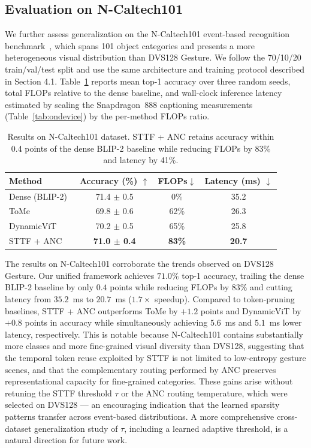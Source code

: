 \documentclass{article}
\begin{document}
\subsection{Evaluation on N-Caltech101}

We further assess generalization on the N-Caltech101 event-based recognition benchmark~\cite{orchard2015ncaltech}, which spans 101 object categories and presents a more heterogeneous visual distribution than DVS128 Gesture. We follow the 70/10/20 train/val/test split and use the same architecture and training protocol described in Section 4.1. Table~\ref{tab:ncaltech} reports mean top-1 accuracy over three random seeds, total FLOPs relative to the dense baseline, and wall-clock inference latency estimated by scaling the Snapdragon~888 captioning measurements (Table~\ref{tab:ondevice}) by the per-method FLOPs ratio.

\begin{table}[htbp]
\centering
\caption{Results on N-Caltech101 dataset. STTF + ANC retains accuracy within 0.4 points of the dense BLIP-2 baseline while reducing FLOPs by 83\% and latency by 41\%.}
\label{tab:ncaltech}
\begin{tabular}{lccc}
\toprule
Method & Accuracy (\%) $\uparrow$ & FLOPs$\downarrow$ & Latency (ms) $\downarrow$ \\
\midrule
Dense (BLIP-2)~\cite{li2023blip2} & 71.4 $\pm$ 0.5 & 0\% & 35.2 \\
ToMe~\cite{bolya2023tome}           & 69.8 $\pm$ 0.6 & 62\% & 26.3 \\
DynamicViT~\cite{rao2021dynamicvit}     & 70.2 $\pm$ 0.5 & 65\% & 25.8 \\
\midrule
STTF + ANC     & \textbf{71.0 $\pm$ 0.4} & \textbf{83\%} & \textbf{20.7} \\
\bottomrule
\end{tabular}
\end{table}

The results on N-Caltech101 corroborate the trends observed on DVS128 Gesture. Our unified framework achieves $71.0\%$ top-1 accuracy, trailing the dense BLIP-2 baseline by only $0.4$ points while reducing FLOPs by $83\%$ and cutting latency from $35.2$~ms to $20.7$~ms ($1.7\times$ speedup). Compared to token-pruning baselines, STTF + ANC outperforms ToMe by $+1.2$ points and DynamicViT by $+0.8$ points in accuracy while simultaneously achieving $5.6$~ms and $5.1$~ms lower latency, respectively. This is notable because N-Caltech101 contains substantially more classes and more fine-grained visual diversity than DVS128, suggesting that the temporal token reuse exploited by STTF is not limited to low-entropy gesture scenes, and that the complementary routing performed by ANC preserves representational capacity for fine-grained categories. These gains arise without retuning the STTF threshold $\tau$ or the ANC routing temperature, which were selected on DVS128 --- an encouraging indication that the learned sparsity patterns transfer across event-based distributions. A more comprehensive cross-dataset generalization study of $\tau$, including a learned adaptive threshold, is a natural direction for future work.
\end{document}
